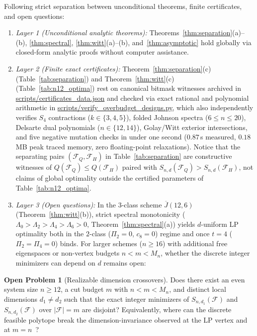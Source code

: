 \documentclass[11pt,reqno]{amsart}
\theoremstyle{definition}
\newtheorem{problem}[theorem]{Open Problem}
\theoremstyle{remark}
\newcommand{\Jbar}{\overline{J}}
\newcommand{\F}{\mathcal{F}}
\begin{document}
Following strict separation between unconditional theorems, finite certificates, and open questions:
\begin{enumerate}
\item \emph{Layer 1 (Unconditional analytic theorems):} Theorems~\ref{thm:separation}(a)--(b), \ref{thm:spectral}, \ref{thm:witt}(a)--(b), and~\ref{thm:asymptotic} hold globally via closed-form analytic proofs without computer assistance.
\item \emph{Layer 2 (Finite exact certificates):} Theorem~\ref{thm:separation}(c) (Table~\ref{tab:separation}) and Theorem~\ref{thm:witt}(c) (Table~\ref{tab:n12_optima}) rest on canonical bitmask witnesses archived in \url{scripts/certificates_data.json} and checked via exact rational and polynomial arithmetic in \url{scripts/verify_overbudget_designs.py}, which also independently verifies $S_4$ contractions ($k\in\{3,4,5\}$), folded Johnson spectra ($6 \le n \le 20$), Delsarte dual polynomials ($n \in \{12,14\}$), Golay/Witt exterior intersections, and five negative mutation checks in under one second ($0.87\,$s measured, $0.18\,$MB peak traced memory, zero floating-point relaxations). Notice that the separating pairs $(\F_Q, \F_H)$ in Table~\ref{tab:separation} are constructive witnesses of $Q(\F_Q) \le Q(\F_H)$ paired with $S_{n,d}(\F_Q) > S_{n,d}(\F_H)$, not claims of global optimality outside the certified parameters of Table~\ref{tab:n12_optima}.
\item \emph{Layer 3 (Open questions):} In the $3$-class scheme $\Jbar(12,6)$ (Theorem~\ref{thm:witt}(b)), strict spectral monotonicity ($\Lambda_0 > \Lambda_2 > \Lambda_4 > \Lambda_6 > 0$, Theorem~\ref{thm:spectral}(a)) yields $d$-uniform LP optimality both in the $2$-class ($\Pi_2 = 0$, $c_8 = 0$) regime and once $t=4$ ($\Pi_2 = \Pi_4 = 0$) binds. For larger schemes ($n \ge 16$) with additional free eigenspaces or non-vertex budgets $n < m < M_n$, whether the discrete integer minimizers can depend on $d$ remains open:
\end{enumerate}

\begin{problem}[Realizable dimension crossovers]\label{prob:crossover}
Does there exist an even system size $n \ge 12$, a cut budget $m$ with $n < m < M_n$, and distinct local dimensions $d_1 \ne d_2$ such that the exact integer minimizers of $S_{n,d_1}(\F)$ and $S_{n,d_2}(\F)$ over $|\F|=m$ are disjoint? Equivalently, where can the discrete feasible polytope break the dimension-invariance observed at the LP vertex and at $m=n$~\cite{Shiroshita2026}?
\end{problem}
\end{document}
